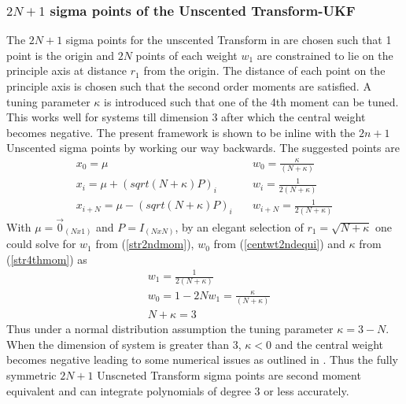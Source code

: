 \documentclass[letterpaper, 10 pt, conference]{ieeeconf}  %
\begin{document}
\subsubsection{$2N+1$ sigma points of the Unscented Transform-UKF}
The $2N+1$ sigma points for the unscented Transform in \cite{c1} are chosen such that 1 point is the origin and $2N$ points of each weight $w_1$ are constrained to lie on the principle axis at distance $r_1$ from the origin. The distance of each point on the principle axis is chosen such that the second order moments are satisfied. A tuning parameter $\kappa$ is introduced such that one of the 4th moment can be tuned. This works well for systems till dimension 3 after which the central weight becomes negative. The present framework is shown to be inline with the $2n+1$ Unscented sigma points by working our way backwards. The suggested points are
\setlength{\arraycolsep}{0.0em}
\begin{eqnarray}
x_0=\mu \quad &w_0=\frac{\kappa}{(N+\kappa)}\\
x_i=\mu+(sqrt{(N+\kappa)P})_i\quad  &w_i=\frac{1}{2(N+\kappa)}\\
x_{i+N}=\mu-(sqrt{(N+\kappa)P})_i\quad 	 &w_{i+N}=\frac{1}{2(N+\kappa)}
\end{eqnarray}
\setlength{\arraycolsep}{5pt}
With $\mu=\vec{0}_{(Nx1)}$ and $P=I_{(NxN)}$, by an elegant selection of $r_1=\sqrt{N+\kappa}$ one could solve for $w_1$ from (\ref{str2ndmom}), $w_0$ from (\ref{centwt2ndequi}) and $\kappa$ from (\ref{str4thmom}) as
 \setlength{\arraycolsep}{0.0em}
\begin{eqnarray}
&w_1=\frac{1}{2(N+\kappa)}\\
&w_0=1-2Nw_1=\frac{\kappa}{(N+\kappa)}\\
&N+\kappa =3
\end{eqnarray}
\setlength{\arraycolsep}{5pt}
Thus under a normal distribution assumption the tuning parameter $\kappa=3-N$. When the dimension of system is greater than 3, $\kappa<0$ and the central weight becomes negative leading to some numerical issues as outlined in \cite{c1}. Thus the fully symmetric $2N+1$ Unscneted Transform sigma points are second moment equivalent and can integrate polynomials of degree 3 or less accurately. 


\end{document}

